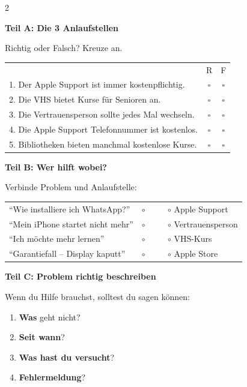 \documentclass[a4paper,landscape,8pt]{extarticle}
\begin{document}
\begin{multicols}{2}

\textbf{\large Teil A: Die 3 Anlaufstellen}

Richtig oder Falsch? Kreuze an.

\vspace{2mm}

\renewcommand{\arraystretch}{1.6}
\begin{tabular}{@{}p{8cm}cc@{}}
& R & F \\
1. Der Apple Support ist immer kostenpflichtig. & $\square$ & $\square$ \\
2. Die VHS bietet Kurse für Senioren an. & $\square$ & $\square$ \\
3. Die Vertrauensperson sollte jedes Mal wechseln. & $\square$ & $\square$ \\
4. Die Apple Support Telefonnummer ist kostenlos. & $\square$ & $\square$ \\
5. Bibliotheken bieten manchmal kostenlose Kurse. & $\square$ & $\square$ \\
\end{tabular}
\renewcommand{\arraystretch}{1}

\vspace{6mm}

\textbf{\large Teil B: Wer hilft wobei?}

Verbinde Problem und Anlaufstelle:

\vspace{2mm}

\renewcommand{\arraystretch}{1.8}
\begin{tabular}{@{}p{5cm}p{4cm}@{}}
``Wie installiere ich WhatsApp?'' & $\circ$ ~~~~ $\circ$ Apple Support \\
``Mein iPhone startet nicht mehr'' & $\circ$ ~~~~ $\circ$ Vertrauensperson \\
``Ich möchte mehr lernen'' & $\circ$ ~~~~ $\circ$ VHS-Kurs \\
``Garantiefall -- Display kaputt'' & $\circ$ ~~~~ $\circ$ Apple Store \\
\end{tabular}
\renewcommand{\arraystretch}{1}

\vspace{6mm}

\textbf{\large Teil C: Problem richtig beschreiben}

Wenn du Hilfe brauchst, solltest du sagen können:

\vspace{2mm}
\begin{enumerate}
\item \textbf{Was} geht nicht? \dotfill
\item \textbf{Seit wann}? \dotfill
\item \textbf{Was hast du versucht}? \dotfill
\item \textbf{Fehlermeldung}? \dotfill
\end{enumerate}


\end{multicols}
\end{document}
